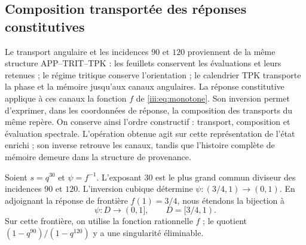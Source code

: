 \subsection{Composition transportée des réponses constitutives}
\label{amp-comp-sec}

Le transport angulaire et les incidences $90$ et $120$ proviennent de la
même structure APP--TRIT--TPK : les feuillets conservent les évaluations et
leurs retenues ; le régime tritique conserve l’orientation ; le calendrier
TPK transporte la phase et la mémoire jusqu’aux canaux angulaires. La réponse
constitutive applique à ces canaux la fonction $f$ de
\eqref{iii:eq:monotone}. Son inversion permet d’exprimer, dans les coordonnées
de réponse, la composition des transports du même repère. On conserve
ainsi l’ordre constructif : transport, composition et évaluation spectrale.
L’opération obtenue agit sur cette représentation de l’état enrichi ;
son inverse retrouve les canaux, tandis que l’histoire complète de mémoire
demeure dans la structure de provenance.

Soient $s=q^{30}$ et $\psi=f^{-1}$. L’exposant $30$ est le plus grand commun
diviseur des incidences $90$ et $120$. L’inversion cubique détermine
$\psi:(3/4,1)\longrightarrow(0,1)$. En adjoignant la réponse de frontière
$f(1)=3/4$, nous étendons la bijection à
\[
 \psi:D\longrightarrow(0,1],\qquad D=[3/4,1).
\]
Sur cette frontière, on utilise la fonction rationnelle $f$ ; le quotient
$(1-q^{90})/(1-q^{120})$ y a une singularité éliminable.

